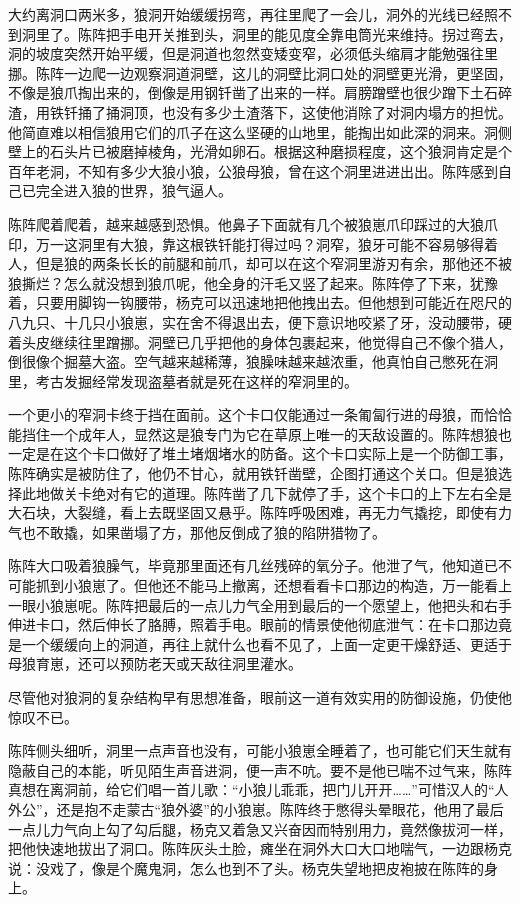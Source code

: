 \par 大约离洞口两米多，狼洞开始缓缓拐弯，再往里爬了一会儿，洞外的光线已经照不到洞里了。陈阵把手电开关推到头，洞里的能见度全靠电筒光来维持。拐过弯去，洞的坡度突然开始平缓，但是洞道也忽然变矮变窄，必须低头缩肩才能勉强往里挪。陈阵一边爬一边观察洞道洞壁，这儿的洞壁比洞口处的洞壁更光滑，更坚固，不像是狼爪掏出来的，倒像是用钢钎凿了出来的一样。肩膀蹭壁也很少蹭下土石碎渣，用铁钎捅了捅洞顶，也没有多少土渣落下，这使他消除了对洞内塌方的担忧。他简直难以相信狼用它们的爪子在这么坚硬的山地里，能掏出如此深的洞来。洞侧壁上的石头片已被磨掉棱角，光滑如卵石。根据这种磨损程度，这个狼洞肯定是个百年老洞，不知有多少大狼小狼，公狼母狼，曾在这个洞里进进出出。陈阵感到自己已完全进入狼的世界，狼气逼人。
\par 陈阵爬着爬着，越来越感到恐惧。他鼻子下面就有几个被狼崽爪印踩过的大狼爪印，万一这洞里有大狼，靠这根铁钎能打得过吗？洞窄，狼牙可能不容易够得着人，但是狼的两条长长的前腿和前爪，却可以在这个窄洞里游刃有余，那他还不被狼撕烂？怎么就没想到狼爪呢，他全身的汗毛又竖了起来。陈阵停了下来，犹豫着，只要用脚钩一钩腰带，杨克可以迅速地把他拽出去。但他想到可能近在咫尺的八九只、十几只小狼崽，实在舍不得退出去，便下意识地咬紧了牙，没动腰带，硬着头皮继续往里蹭挪。洞壁已几乎把他的身体包裹起来，他觉得自己不像个猎人，倒很像个掘墓大盗。空气越来越稀薄，狼臊味越来越浓重，他真怕自己憋死在洞里，考古发掘经常发现盗墓者就是死在这样的窄洞里的。
\par 一个更小的窄洞卡终于挡在面前。这个卡口仅能通过一条匍匐行进的母狼，而恰恰能挡住一个成年人，显然这是狼专门为它在草原上唯一的天敌设置的。陈阵想狼也一定是在这个卡口做好了堆土堵烟堵水的防备。这个卡口实际上是一个防御工事，陈阵确实是被防住了，他仍不甘心，就用铁钎凿壁，企图打通这个关口。但是狼选择此地做关卡绝对有它的道理。陈阵凿了几下就停了手，这个卡口的上下左右全是大石块，大裂缝，看上去既坚固又悬乎。陈阵呼吸困难，再无力气撬挖，即使有力气也不敢撬，如果凿塌了方，那他反倒成了狼的陷阱猎物了。
\par 陈阵大口吸着狼臊气，毕竟那里面还有几丝残碎的氧分子。他泄了气，他知道已不可能抓到小狼崽了。但他还不能马上撤离，还想看看卡口那边的构造，万一能看上一眼小狼崽呢。陈阵把最后的一点儿力气全用到最后的一个愿望上，他把头和右手伸进卡口，然后伸长了胳膊，照着手电。眼前的情景使他彻底泄气：在卡口那边竟是一个缓缓向上的洞道，再往上就什么也看不见了，上面一定更干燥舒适、更适于母狼育崽，还可以预防老天或天敌往洞里灌水。
\par 尽管他对狼洞的复杂结构早有思想准备，眼前这一道有效实用的防御设施，仍使他惊叹不已。
\par 陈阵侧头细听，洞里一点声音也没有，可能小狼崽全睡着了，也可能它们天生就有隐蔽自己的本能，听见陌生声音进洞，便一声不吭。要不是他已喘不过气来，陈阵真想在离洞前，给它们唱一首儿歌：“小狼儿乖乖，把门儿开开……”可惜汉人的“人外公”，还是抱不走蒙古“狼外婆”的小狼崽。陈阵终于憋得头晕眼花，他用了最后一点儿力气向上勾了勾后腿，杨克又着急又兴奋因而特别用力，竟然像拔河一样，把他快速地拔出了洞口。陈阵灰头土脸，瘫坐在洞外大口大口地喘气，一边跟杨克说：没戏了，像是个魔鬼洞，怎么也到不了头。杨克失望地把皮袍披在陈阵的身上。
